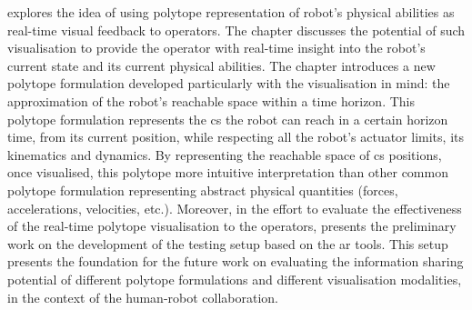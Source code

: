 

 explores the idea of using polytope representation of robot's physical abilities as real-time visual feedback to operators. The chapter discusses the potential of such visualisation to provide the operator with real-time insight into the robot's current state and its current physical abilities. The chapter introduces a new polytope formulation developed particularly with the visualisation in mind: the approximation of the robot's reachable space within a time horizon. This polytope formulation represents the \gls{cs} the robot can reach in a certain horizon time, from its current position, while respecting all the robot's actuator limits, its kinematics and dynamics. 
By representing the reachable space of \gls{cs} positions, once visualised, this polytope more intuitive interpretation than other common polytope formulation representing abstract physical quantities (forces, accelerations, velocities, etc.). 
Moreover, in the effort to evaluate the effectiveness of the real-time polytope visualisation to the operators, 
 presents the preliminary work on the development of the testing setup based on the \gls{ar} tools. This setup presents the foundation for the future work on evaluating the information sharing potential of different polytope formulations and different visualisation modalities, in the context of the human-robot collaboration. 



